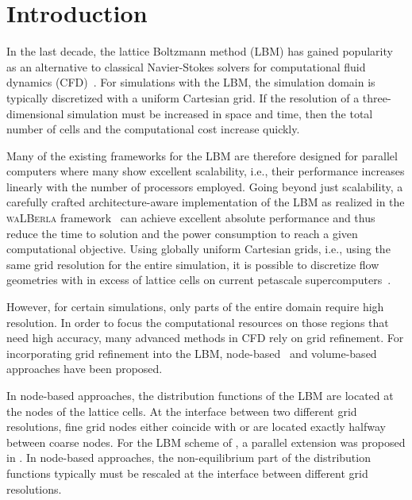 \documentclass[final,leqno,onefignum,onetabnum]{siamltex1213}
\newcommand{\Walberla}{\textsc{waLBerla}}
\begin{document}
\section{Introduction}

In the last decade, the lattice Boltzmann method (LBM) has gained popularity
as an alternative to classical Navier-Stokes solvers for computational fluid dynamics
(CFD)~\cite{Chen98,Aidun2010}.
For simulations with the LBM, the simulation domain 
is typically discretized with a uniform Cartesian grid.
If the resolution of a three-dimensional simulation must be increased
in space and time, then the total number of cells
and the computational cost increase quickly.

Many of the existing frameworks for the LBM \cite{Feichtinger2011105,Hasert2014784,palabos,heuveline2007,lb3d,Groen2013412,Randles2013,Desplat2001273}
are therefore designed for parallel computers
where many show excellent scalability, i.e., their performance increases linearly
with the number of processors employed.
Going beyond just scalability, a carefully crafted architecture-aware implementation
of the LBM as realized in the \Walberla{} framework~\cite{Godenschwager2013} can achieve excellent absolute performance and thus reduce the time to solution
and the power consumption to reach a given computational objective.
Using globally uniform Cartesian grids, i.e., using the same grid resolution for the entire simulation,
it is possible to discretize flow geometries with in excess of  lattice cells on current petascale supercomputers~\cite{Godenschwager2013}.

However, for certain simulations, only parts of the entire domain require high resolution.
In order to focus the computational resources on those regions that need
high accuracy, many advanced methods in CFD rely on grid refinement.
For incorporating grid refinement into the LBM, node-based~\cite{Filippova1998219,Kandhai2000100,Lagrava20124808,FLD:FLD280,Peng2006460,Toelke2006820}
and volume-based~\cite{Rohde2006,Chen2006,Neumann2013,Hasert2014784,Guzik2014} approaches have been proposed.

In node-based approaches, the distribution functions of the LBM are located at the nodes of the lattice cells.
At the interface between two different grid resolutions, fine grid nodes either coincide with or are located exactly halfway between coarse nodes.
For the LBM scheme of \cite{Toelke2006820}, a parallel extension was proposed in \cite{Freudiger08}.
In node-based approaches,
the non-equilibrium part of the distribution functions typically must be rescaled at the interface between different grid resolutions.
\end{document}
